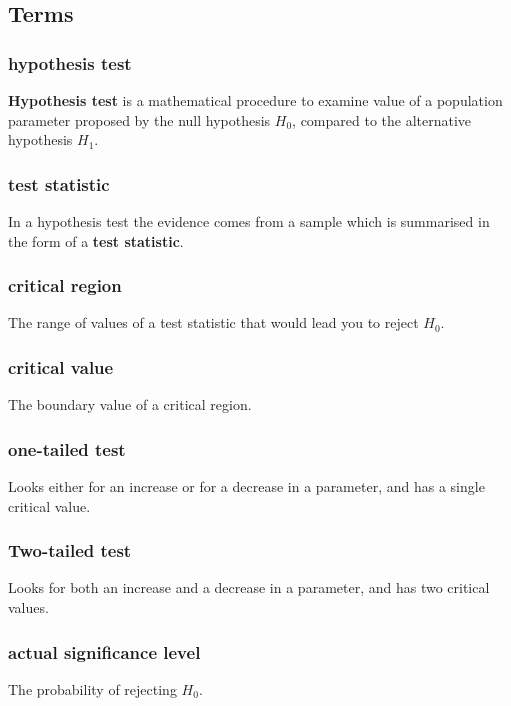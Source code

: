 \documentclass[a4paper,9pt]{scrartcl}
\begin{document}
    \subsection{Terms}

    \subsubsection{hypothesis test}

    \textbf{Hypothesis test} is a mathematical procedure to examine value of a population parameter proposed by the null hypothesis $H_0$, compared to the alternative hypothesis $H_1$.

    \subsubsection{test statistic}

    In a hypothesis test the evidence comes from a sample which is summarised in the form of a \textbf{test statistic}.

    \subsubsection{critical region}

    The range of values of a test statistic that would lead you to reject $H_0$.

    \subsubsection{critical value}

    The boundary value of a critical region.

    \subsubsection{one-tailed test}

    Looks either for an increase or for a decrease in a parameter, and has a single critical value.

    \subsubsection{Two-tailed test}

    Looks for both an increase and a decrease in a parameter, and has two critical values.

    \subsubsection{actual significance level}

    The probability of rejecting $H_0$.
\end{document}
